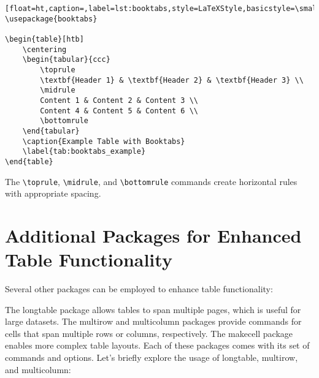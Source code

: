 		\begin{lstlisting}[float=ht,caption=,label=lst:booktabs,style=LaTeXStyle,basicstyle=\small\ttfamily,]
\usepackage{booktabs}

\begin{table}[htb]
	\centering
	\begin{tabular}{ccc}
		\toprule
		\textbf{Header 1} & \textbf{Header 2} & \textbf{Header 3} \\
		\midrule
		Content 1 & Content 2 & Content 3 \\
		Content 4 & Content 5 & Content 6 \\
		\bottomrule
	\end{tabular}
	\caption{Example Table with Booktabs}
	\label{tab:booktabs_example}
\end{table}
		\end{lstlisting}

		The \lstinline|\toprule|, \lstinline|\midrule|, and \lstinline|\bottomrule| commands create horizontal rules with appropriate spacing.

	\section{Additional Packages for Enhanced Table Functionality}

		Several other packages can be employed to enhance table functionality:

		The longtable package allows tables to span multiple pages, which is useful for large datasets.
		The multirow and multicolumn packages provide commands for cells that span multiple rows or columns, respectively.
		The makecell package enables more complex table layouts.
		Each of these packages comes with its set of commands and options. Let's briefly explore the usage of longtable, multirow, and multicolumn:

